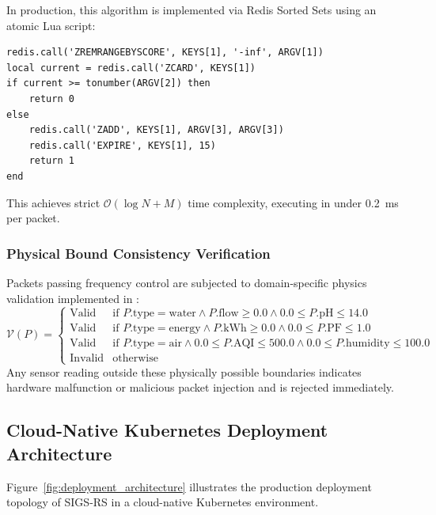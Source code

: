 \documentclass[a4paper]{article}
\begin{document}
In production, this algorithm is implemented via Redis Sorted Sets using an atomic Lua script:
\begin{Verbatim}[fontsize=\footnotesize,breaklines=true]
redis.call('ZREMRANGEBYSCORE', KEYS[1], '-inf', ARGV[1])
local current = redis.call('ZCARD', KEYS[1])
if current >= tonumber(ARGV[2]) then
    return 0
else
    redis.call('ZADD', KEYS[1], ARGV[3], ARGV[3])
    redis.call('EXPIRE', KEYS[1], 15)
    return 1
end
\end{Verbatim}
This achieves strict $\mathcal{O}(\log N + M)$ time complexity, executing in under 0.2~ms per packet.

\subsubsection{Physical Bound Consistency Verification}
Packets passing frequency control are subjected to domain-specific physics validation implemented in :
\begin{equation}
\mathcal{V}(P) = \begin{cases}
\text{Valid} & \text{if } P.\text{type} = \text{water} \land P.\text{flow} \ge 0.0 \land 0.0 \le P.\text{pH} \le 14.0 \\
\text{Valid} & \text{if } P.\text{type} = \text{energy} \land P.\text{kWh} \ge 0.0 \land 0.0 \le P.\text{PF} \le 1.0 \\
\text{Valid} & \text{if } P.\text{type} = \text{air} \land 0.0 \le P.\text{AQI} \le 500.0 \land 0.0 \le P.\text{humidity} \le 100.0 \\
\text{Invalid} & \text{otherwise}
\end{cases}
\end{equation}
Any sensor reading outside these physically possible boundaries indicates hardware malfunction or malicious packet injection and is rejected immediately.

\subsection{Cloud-Native Kubernetes Deployment Architecture}
Figure~\ref{fig:deployment_architecture} illustrates the production deployment topology of SIGS-RS in a cloud-native Kubernetes environment.
\end{document}
